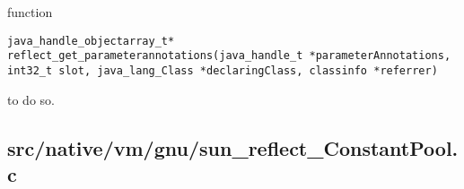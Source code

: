 \documentclass[a4paper, 10pt, titlepage]{scrartcl} %
\begin{document}
function \begin{scriptsize}\verb|java_handle_objectarray_t|\hspace{0.0pt}\verb|*|\hspace{0.0pt}\verb||\hspace{0.0pt}\verb| |\hspace{0.0pt}\verb|reflect_get_parameterannotations|\hspace{0.0pt}\verb|(|\hspace{0.0pt}\verb|java_handle_t|\hspace{0.0pt}\verb| |\hspace{0.0pt}\verb||\hspace{0.0pt}\verb|*|\hspace{0.0pt}\verb|parameterAnnotations|\hspace{0.0pt}\verb|,|\hspace{0.0pt}\verb||\hspace{0.0pt}\verb| |\hspace{0.0pt}\verb|int32_t|\hspace{0.0pt}\verb| |\hspace{0.0pt}\verb|slot|\hspace{0.0pt}\verb|,|\hspace{0.0pt}\verb||\hspace{0.0pt}\verb| |\hspace{0.0pt}\verb|java_lang_Class|\hspace{0.0pt}\verb| |\hspace{0.0pt}\verb||\hspace{0.0pt}\verb|*|\hspace{0.0pt}\verb|declaringClass|\hspace{0.0pt}\verb|,|\hspace{0.0pt}\verb||\hspace{0.0pt}\verb| |\hspace{0.0pt}\verb|classinfo|\hspace{0.0pt}\verb| |\hspace{0.0pt}\verb||\hspace{0.0pt}\verb|*|\hspace{0.0pt}\verb|referrer|\hspace{0.0pt}\verb|)|\hspace{0.0pt}\verb||\end{scriptsize} to do so.

\subsection{src/native/vm/gnu/sun\_reflect\_ConstantPool.c}
\label{sec:src/native/vm/gnu/sun_reflect_ConstantPool.c}
\end{document}
